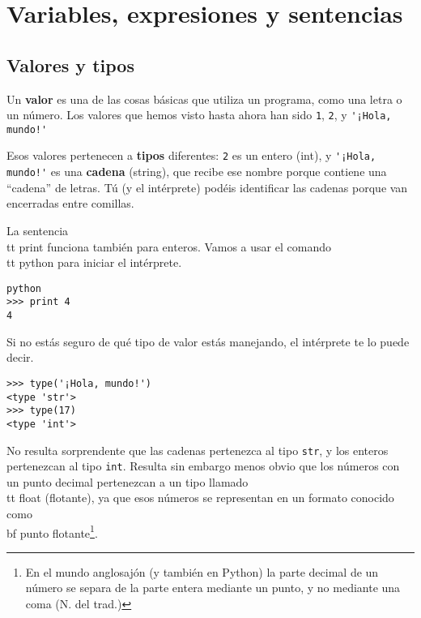 
\chapter{Variables, expresiones y sentencias}

\section{Valores y tipos}

Un {\bf valor} es una de las cosas básicas que utiliza un programa,
como una letra o un número.
Los valores que hemos visto hasta ahora
han sido {\tt 1}, {\tt 2}, y
\verb"'¡Hola, mundo!'"

Esos valores pertenecen a {\bf tipos} diferentes:
{\tt 2} es un entero (int), y \verb"'¡Hola, mundo!'" es una {\bf cadena} (string),
que recibe ese nombre porque contiene una ``cadena'' de letras.
Tú (y el intérprete) podéis identificar
las cadenas porque van encerradas entre comillas.


La sentencia {\\tt print} funciona también para enteros. Vamos a usar el
comando {\\tt python} para iniciar el intérprete.

\beforeverb
\begin{verbatim}
python
>>> print 4
4
\end{verbatim}
\afterverb
%
Si no estás seguro de qué tipo de valor estás manejando, el intérprete te lo puede decir.

\beforeverb
\begin{verbatim}
>>> type('¡Hola, mundo!')
<type 'str'>
>>> type(17)
<type 'int'>
\end{verbatim}
\afterverb
%
No resulta sorprendente que las cadenas pertenezca al tipo {\tt str}, y los
enteros pertenezcan al tipo {\tt int}. Resulta sin embargo menos obvio
que los números con un punto decimal pertenezcan a un tipo llamado {\\tt float} (flotante),
ya que esos números se representan en un formato
conocido como {\\bf punto flotante}\footnote{En el mundo anglosajón (y también en Python)
la parte decimal de un número se separa de la parte entera mediante un punto, y no mediante una coma
(N. del trad.)}.

